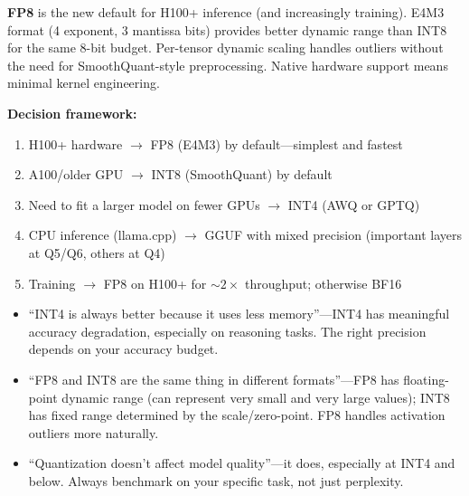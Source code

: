 \begin{interviewq}
\textbf{FP8} is the new default for H100+ inference (and increasingly training). E4M3 format (4 exponent, 3 mantissa bits) provides better dynamic range than INT8 for the same 8-bit budget. Per-tensor dynamic scaling handles outliers without the need for SmoothQuant-style preprocessing. Native hardware support means minimal kernel engineering.

\textbf{Decision framework:}
\begin{enumerate}
    \item H100+ hardware $\to$ FP8 (E4M3) by default---simplest and fastest
    \item A100/older GPU $\to$ INT8 (SmoothQuant) by default
    \item Need to fit a larger model on fewer GPUs $\to$ INT4 (AWQ or GPTQ)
    \item CPU inference (llama.cpp) $\to$ GGUF with mixed precision (important layers at Q5/Q6, others at Q4)
    \item Training $\to$ FP8 on H100+ for $\sim$$2\times$ throughput; otherwise BF16
\end{enumerate}

\redflags
\begin{itemize}
    \item ``INT4 is always better because it uses less memory''---INT4 has meaningful accuracy degradation, especially on reasoning tasks. The right precision depends on your accuracy budget.
    \item ``FP8 and INT8 are the same thing in different formats''---FP8 has floating-point dynamic range (can represent very small and very large values); INT8 has fixed range determined by the scale/zero-point. FP8 handles activation outliers more naturally.
    \item ``Quantization doesn't affect model quality''---it does, especially at INT4 and below. Always benchmark on your specific task, not just perplexity.
\end{itemize}



\end{interviewq}
